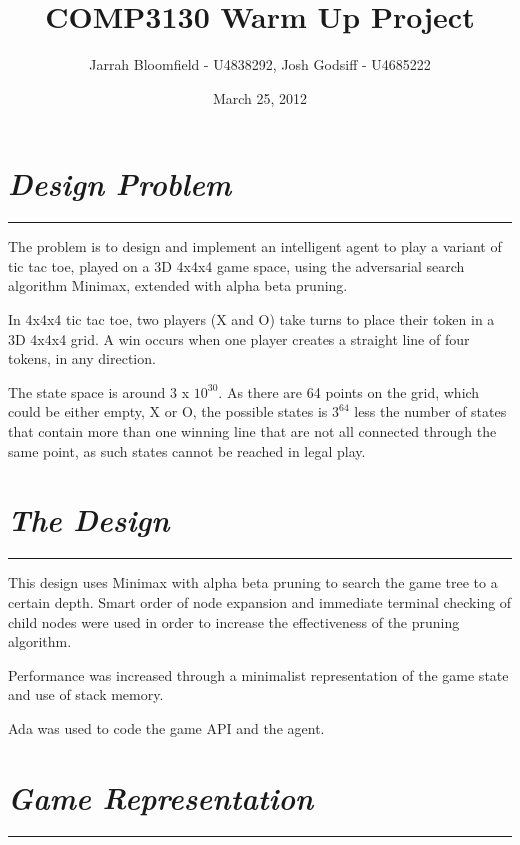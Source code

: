 \documentclass[10pt]{report}
\begin{document}
\title{COMP3130 Warm Up Project}
\date{March 25, 2012}
\author{Jarrah Bloomfield - U4838292, Josh Godsiff - U4685222}
\maketitle

\setlength{\columnsep}{22.0pt}
\begin{multicols}{2}

\section*{\emph{Design Problem}}
\hrule
\vspace{0.4cm}

The problem is to design and implement an intelligent agent to play a variant of tic tac toe, played on a 3D 4x4x4 game space, using the adversarial search algorithm Minimax, extended with alpha beta pruning.

In 4x4x4 tic tac toe, two players (X and O) take turns to place their token in a 3D 4x4x4 grid. A win occurs when one player creates a straight line of four tokens, in any direction.

The state space is around 3 x $10^{30}$. As there are 64 points on the grid, which could be either empty, X or O, the possible states is $3^64$ less the number of states that contain more than one winning line that are not all connected through the same point, as such states cannot be reached in legal play.

\section*{\emph{{The Design}}}
\hrule
\vspace{0.4cm}

This design uses Minimax with alpha beta pruning to search the game tree to a certain depth. Smart order of node expansion and immediate terminal checking of child nodes were used in order to increase the effectiveness of the pruning algorithm.

Performance was increased through a minimalist representation of the game state and use of stack memory.

Ada was used to code the game API and the agent.

\section*{\emph{\textmd{Game Representation}}}
\hrule
\vspace{0.4cm}


\end{multicols}
\end{document}
